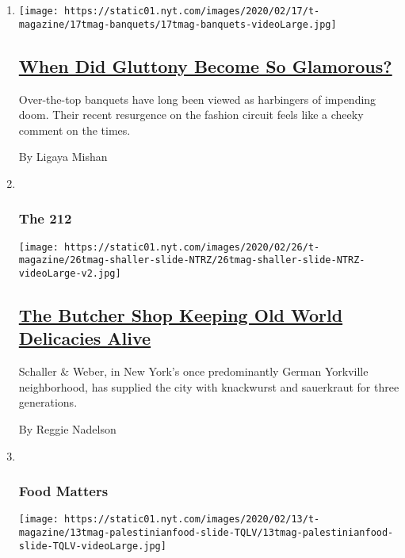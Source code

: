\begin{enumerate}
\def\labelenumi{\arabic{enumi}.}
\item
  \texttt{[image: https://static01.nyt.com/images/2020/02/17/t-magazine/17tmag-banquets/17tmag-banquets-videoLarge.jpg]}

  \hypertarget{when-did-gluttony-become-so-glamorous}{%
  \subsection{\texorpdfstring{\href{/2020/02/21/t-magazine/fashion-banquets.html}{When
  Did Gluttony Become So
  Glamorous?}}{When Did Gluttony Become So Glamorous?}}\label{when-did-gluttony-become-so-glamorous}}

  Over-the-top banquets have long been viewed as harbingers of impending
  doom. Their recent resurgence on the fashion circuit feels like a
  cheeky comment on the times.

  By Ligaya Mishan
\item ~
  \hypertarget{the-212-1}{%
  \subsubsection{The 212}\label{the-212-1}}

  \texttt{[image: https://static01.nyt.com/images/2020/02/26/t-magazine/26tmag-shaller-slide-NTRZ/26tmag-shaller-slide-NTRZ-videoLarge-v2.jpg]}

  \hypertarget{the-butcher-shop-keeping-old-world-delicacies-alive}{%
  \subsection{\texorpdfstring{\href{/2020/02/26/t-magazine/schaller-weber.html}{The
  Butcher Shop Keeping Old World Delicacies
  Alive}}{The Butcher Shop Keeping Old World Delicacies Alive}}\label{the-butcher-shop-keeping-old-world-delicacies-alive}}

  Schaller \& Weber, in New York's once predominantly German Yorkville
  neighborhood, has supplied the city with knackwurst and sauerkraut for
  three generations.

  By Reggie Nadelson
\item ~
  \hypertarget{food-matters}{%
  \subsubsection{Food Matters}\label{food-matters}}

  \texttt{[image: https://static01.nyt.com/images/2020/02/13/t-magazine/13tmag-palestinianfood-slide-TQLV/13tmag-palestinianfood-slide-TQLV-videoLarge.jpg]}


\end{enumerate}
